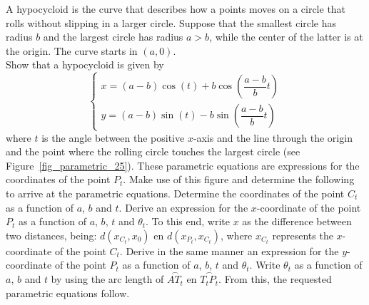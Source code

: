\ifanalysis
\begin{Exercise}[difficulty = 3, label=Oef_hypocycloide] A hypocycloid is the curve that describes how a points moves on a circle that rolls without slipping in a larger circle. Suppose that the smallest circle has radius $b$ and the largest circle has radius $a>b$, while the center of the latter is at the origin. The curve starts in $(a,0)$. \\ 
	Show that a hypocycloid is given by
    \[\left\{\begin{array}{l} x = (a-b)\cos (t) + b \cos \left( \dfrac{a-b}{b} t  \right) \\ y=(a-b)\sin (t)  - b \sin \left( \dfrac{a-b}{b} t  \right) \end{array}\right.\]
    where $t$ is the angle between the positive $x$-axis and the line through the origin and the point where the rolling circle touches the largest circle (see Figure~\ref{fig_parametric_25}).  These parametric equations are expressions for the coordinates of the point $P_t$. Make use of this figure and determine the following to arrive at the parametric equations.
        \Question Determine the coordinates of the point $C_t$ as a function of $a$, $b$ and $t$. 
        \Question Derive an expression for the $x$-coordinate of the point $P_t$ as a function of $a$, $b$, $t$ and $\theta_t$. To this end, write $x$ as the difference between two distances, being: $d(x_{C_t}, x_0)$ en $d(x_{P_t}, x_{C_t})$, where $x_{C_t}$ represents the $x$-coordinate of the point $C_t$. 
        \Question Derive in the same manner an expression for the $y$-coordinate of the point $P_t$ as a function of $a$, $b$, $t$ and $\theta_t$. 
        \Question Write $\theta_t$ as a function of $a$, $b$ and $t$ by using the arc length of $\stackrel{\frown}{AT_t}$ en $\stackrel{\frown}{T_tP_t}$. From this, the requested parametric equations follow.
    

\end{Exercise}
